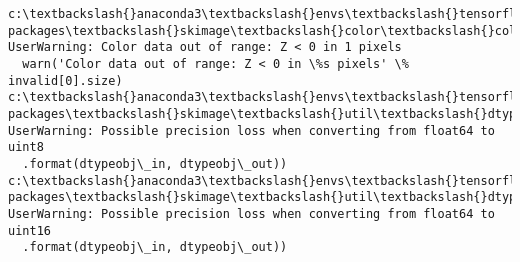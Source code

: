 \documentclass[11pt]{article}
\begin{document}
    \begin{Verbatim}[commandchars=\\\{\}]
c:\textbackslash{}anaconda3\textbackslash{}envs\textbackslash{}tensorflow\textbackslash{}lib\textbackslash{}site-packages\textbackslash{}skimage\textbackslash{}color\textbackslash{}colorconv.py:985: UserWarning: Color data out of range: Z < 0 in 1 pixels
  warn('Color data out of range: Z < 0 in \%s pixels' \% invalid[0].size)
c:\textbackslash{}anaconda3\textbackslash{}envs\textbackslash{}tensorflow\textbackslash{}lib\textbackslash{}site-packages\textbackslash{}skimage\textbackslash{}util\textbackslash{}dtype.py:122: UserWarning: Possible precision loss when converting from float64 to uint8
  .format(dtypeobj\_in, dtypeobj\_out))
c:\textbackslash{}anaconda3\textbackslash{}envs\textbackslash{}tensorflow\textbackslash{}lib\textbackslash{}site-packages\textbackslash{}skimage\textbackslash{}util\textbackslash{}dtype.py:122: UserWarning: Possible precision loss when converting from float64 to uint16
  .format(dtypeobj\_in, dtypeobj\_out))

    \end{Verbatim}


    
    
    
    
\end{document}
